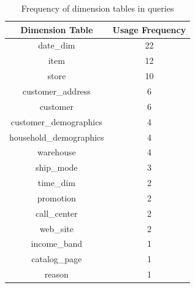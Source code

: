 \documentclass[conference]{IEEEtran}
\begin{document}
\begin{table}[htbp]
    \caption{Frequency of dimension tables in queries}
    \begin{center}
        \begin{tabular}{|c|c|}
            \hline
            \textbf{Dimension Table} & \textbf{Usage Frequency} \\
            \hline
            date\_dim                & 22                       \\
            item                     & 12                       \\
            store                    & 10                       \\
            customer\_address        & 6                        \\
            customer                 & 6                        \\
            customer\_demographics   & 4                        \\
            household\_demographics  & 4                        \\
            warehouse                & 4                        \\
            ship\_mode               & 3                        \\
            time\_dim                & 2                        \\
            promotion                & 2                        \\
            call\_center             & 2                        \\
            web\_site                & 2                        \\
            income\_band             & 1                        \\
            catalog\_page            & 1                        \\
            reason                   & 1                        \\
            \hline
        \end{tabular}
        \label{tab:dimension_usage}
    \end{center}
\end{table}
\end{document}
